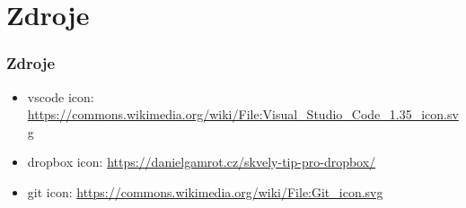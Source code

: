 \documentclass[aspectratio=43]{beamer}
\begin{document}
\appendix
\section{Zdroje}
\begin{frame}[plain]
	\frametitle{Zdroje}
	\begin{itemize}
		\item vscode icon: 
		\url{https://commons.wikimedia.org/wiki/File:Visual_Studio_Code_1.35_icon.svg}
		\item dropbox icon: \url{https://danielgamrot.cz/skvely-tip-pro-dropbox/}
		\item git icon: \url{https://commons.wikimedia.org/wiki/File:Git_icon.svg}
	\end{itemize}
\end{frame}
\end{document}
